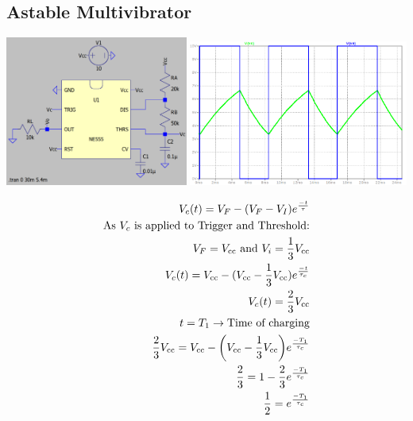 \documentclass[a4paper, 12pt]{report}
\begin{document}
\begin{center}
\begin{center}
\begin{center}
\begin{center}
\begin{center}
\begin{center}
\begin{center}
\begin{center}
\begin{center}
\begin{center}
\begin{center}
\begin{center}
\section{Astable Multivibrator}
\begin{center}
    \includegraphics[width=0.45\textwidth]{figures/32c.png}
    \includegraphics[width=0.54\textwidth]{figures/32w.png}\\
\end{center}
\begin{multicols}{2}
\begin{equation}\notag
        \begin{align}
            V_c(t) = V_F - (V_F - V_I)e^{\frac{-t}{\tau}}\\
            \text{As\ } V_c \text{\ is\ applied\ to\ Trigger\ and\ Threshold:}\\
            V_F = V_\text{cc} \text{\ and\ } V_i = \frac{1}{3}V_\text{cc}\\
            V_c(t) = V_\text{cc} - (V_\text{cc} - \frac{1}{3}V_\text{cc})e^{\frac{-t}{\tau_c}}\\
            V_c(t) = \frac{2}{3}V_\text{cc}\\
            t = T_1 \rightarrow \text{Time\ of\ charging}\\
            \frac{2}{3}V_\text{cc} = V_\text{cc} - \bigg(V_\text{cc} - \frac{1}{3}V_\text{cc}\bigg)e^{\frac{-T_1}{\tau_c}}\\
            \frac{2}{3} = 1-\frac{2}{3}e^{\frac{-T_1}{\tau_c}}\\
            \frac{1}{2} = e^{\frac{-T_1}{\tau_c}}\\

\end{align}
\end{equation}
\end{multicols}
\end{center}
\end{center}
\end{center}
\end{center}
\end{center}
\end{center}
\end{center}
\end{center}
\end{center}
\end{center}
\end{center}
\end{center}
\end{document}
